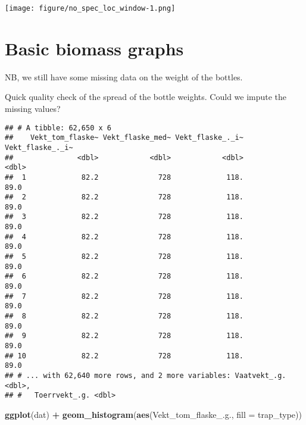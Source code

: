 \documentclass[]{article}
\newenvironment{Shaded}{\begin{snugshade}}{\end{snugshade}}
\newcommand{\DataTypeTok}[1]{\textcolor[rgb]{0.13,0.29,0.53}{#1}}
\newcommand{\KeywordTok}[1]{\textcolor[rgb]{0.13,0.29,0.53}{\textbf{#1}}}
\newcommand{\NormalTok}[1]{#1}
\newcommand{\OperatorTok}[1]{\textcolor[rgb]{0.81,0.36,0.00}{\textbf{#1}}}
\newcommand{\StringTok}[1]{\textcolor[rgb]{0.31,0.60,0.02}{#1}}
\begin{document}
\texttt{[image: figure/no\_spec\_loc\_window-1.png]}

\hypertarget{basic-biomass-graphs}{%
\section{Basic biomass graphs}\label{basic-biomass-graphs}}

NB, we still have some missing data on the weight of the bottles.

Quick quality check of the spread of the bottle weights. Could we impute
the missing values?

\begin{Shaded}
\end{Shaded}

\begin{verbatim}
## # A tibble: 62,650 x 6
##    Vekt_tom_flaske~ Vekt_flaske_med~ Vekt_flaske_._i~ Vekt_flaske_._i~
##               <dbl>            <dbl>            <dbl>            <dbl>
##  1             82.2              728             118.             89.0
##  2             82.2              728             118.             89.0
##  3             82.2              728             118.             89.0
##  4             82.2              728             118.             89.0
##  5             82.2              728             118.             89.0
##  6             82.2              728             118.             89.0
##  7             82.2              728             118.             89.0
##  8             82.2              728             118.             89.0
##  9             82.2              728             118.             89.0
## 10             82.2              728             118.             89.0
## # ... with 62,640 more rows, and 2 more variables: Vaatvekt_.g. <dbl>,
## #   Toerrvekt_.g. <dbl>
\end{verbatim}

\begin{Shaded}
\begin{Highlighting}[]
\KeywordTok{ggplot}\NormalTok{(dat)  }\OperatorTok{+}
\StringTok{  }\KeywordTok{geom_histogram}\NormalTok{(}\KeywordTok{aes}\NormalTok{(Vekt_tom_flaske_.g., }\DataTypeTok{fill =}\NormalTok{ trap_type))}
\end{Highlighting}
\end{Shaded}
\end{document}
